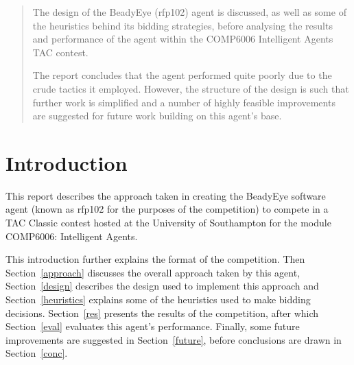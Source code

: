 \documentclass{acm_proc_article-sp}
\begin{document}
\maketitle


\begin{abstract}
 The design of the BeadyEye (rfp102) agent is discussed, as well as some of the heuristics behind its bidding strategies, before analysing the results and performance of the agent within the COMP6006 Intelligent Agents TAC contest.
 
 The report concludes that the agent performed quite poorly due to the crude tactics it employed.  However, the structure of the design is such that further work is simplified and a number of highly feasible improvements are suggested for future work building on this agent's base.
\end{abstract}




\section{Introduction}
 \label{intro}

 This report describes the approach taken in creating the BeadyEye software agent (known as rfp102 for the purposes of the competition) to compete in a TAC Classic contest hosted at the University of Southampton for the module COMP6006: Intelligent Agents.
 
 This introduction further explains the format of the competition.  Then Section~\ref{approach} discusses the overall approach taken by this agent, Section~\ref{design} describes the design used to implement this approach and Section~\ref{heuristics} explains some of the heuristics used to make bidding decisions.  Section~\ref{res} presents the results of the competition, after which Section~\ref{eval} evaluates this agent's performance.  Finally, some future improvements are suggested in Section~\ref{future}, before conclusions are drawn in Section~\ref{conc}.
 
\end{document}
